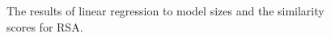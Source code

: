 \documentclass[letterpaper]{article} %
\begin{document}
\begin{figure}[t]
	\centering
	\caption{The results of linear regression to model sizes and the similarity scores for RSA.}
	\label{Fig.model_size_compare_rsa}
\end{figure}
\end{document}
